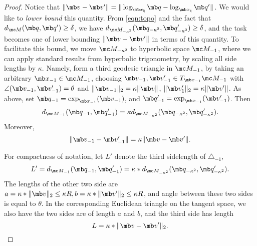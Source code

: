 \begin{proof}
Notice that $\| \mb v - \mb v' \| = \| \log_{\mb x_\natural} \mb q - \log_{\mb x_\natural} \mb q' \|$. We would like to {\em lower bound} this quantity. From \eqref{eqn:topo} and the fact that $d_{\mc M}(\mb q,\mb q') \ge \delta$, we have $d_{\mc M_{-\kappa^2}}( \mb q_{-\kappa^2}, \mb q'_{-\kappa^2} ) \ge \delta$, and the task becomes one of lower bounding $\| \mb v - \mb v' \|$ in terms of this quantity. To facilitate this bound, we move $\mc M_{-\kappa^2}$ to hyperbolic 
space $\mc M_{-1}$, where we can apply standard results from hyperbolic trigonometry, by scaling all side lengths by $\kappa$. Namely, form a third geodesic triangle in $\mc M_{-1}$, by taking an arbitrary $\mb x_{-1} \in \mc M_{-1}$, choosing $\mb v_{-1}, \mb v'_{-1} \in T_{\mb x_{-1}} \mc M_{-1} $ with $\angle( \mb v_{-1}, \mb v'_{-1} ) = \theta$ and $\| \mb v_{-1} \|_2 = \kappa \| \mb v \|$, $\| \mb v'_{1} \|_2 = \kappa \| \mb v' \|$. As above, set $\mb q_{-1} = \exp_{\mb x_{-1}}(\mb v_{-1})$, and $\mb q'_{-1} = \exp_{\mb x_{-1}}(\mb v'_{-1})$. Then 
\begin{equation}
    d_{\mc M_{-1}}(\mb q_{-1},\mb q'_{-1}) = \kappa d_{\mc M_{-\kappa^2}}( \mb q_{-\kappa^2}, \mb q'_{-\kappa^2} ). 
\end{equation}
Moreover, 
\begin{equation}
    \| \mb v_{-1} - \mb v'_{-1} \| = \kappa \| \mb v - \mb v' \|. 
\end{equation}


\noindent For compactness of notation, let $L'$ denote the third sidelength of $\triangle_{-1}$, 
\begin{equation}
    L' =  d_{\mc M_{-1}}(\mb q_{-1},\mb q'_{-1})  = \kappa *  d_{\mc M_{-\kappa^2}}(\mb q_{-\kappa^2}, \mb q_{-\kappa^2}').
\end{equation}
The lengths of the other two side are $a =\kappa* \|\mb v\|_2 \leq \kappa R, b=\kappa* \|\mb v'\|_2 \leq \kappa R$, and angle between these two sides is equal to $\theta$. In the corresponding Euclidean triangle on the tangent space, we also have the two sides are of length $a$ and $b$, and the third side has length
\begin{equation}
   L = \kappa * \|\mb v -\mb v'\|_2. 
\end{equation}



\end{proof}
